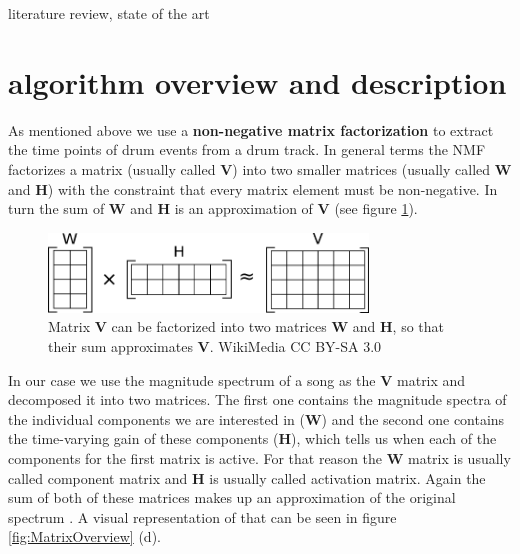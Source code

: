 \documentclass{article}
\begin{document}
\noindent\makebox[\linewidth]{\rule{\linewidth}{0.4pt}}
literature review, state of the art




\section{algorithm overview and description}
\label{sec:algo}

As mentioned above we use a \textbf{non-negative matrix factorization} to extract the time points of drum events from a drum track.
In general terms the NMF factorizes a matrix (usually called $\mathbf{V}$) into two smaller matrices (usually called $\mathbf{W}$ and $\mathbf{H}$) with the constraint that every matrix element must be non-negative.
In turn the sum of $\mathbf{W}$ and $\mathbf{H}$ is an approximation of $\mathbf{V}$ (see figure \ref{fig:NMF}).

\begin{figure}[htb]

\begin{minipage}[b]{1.0\linewidth}
  \centering
  \centerline{\includegraphics[width=8.5cm]{figures/NMF}}
  \medskip
\end{minipage}

\caption{Matrix $\mathbf{V}$ can be factorized into two matrices $\mathbf{W}$ and $\mathbf{H}$, so that their sum approximates $\mathbf{V}$. \scriptsize{\textsf{\textcopyright} WikiMedia CC BY-SA 3.0}}
\label{fig:NMF}

\end{figure}

In our case we use the magnitude spectrum of a song as the $\mathbf{V}$ matrix and decomposed it into two matrices.
The first one contains the magnitude spectra of the individual components we are interested in ($\mathbf{W}$) and the second one contains the time-varying gain of these components ($\mathbf{H}$), which tells us when each of the components for the first matrix is active.
For that reason the $\mathbf{W}$ matrix is usually called component matrix and $\mathbf{H}$ is usually called activation matrix.
Again the sum of both of these matrices makes up an approximation of the original spectrum \cite{smaragdis2003}.
A visual representation of that can be seen in figure \ref{fig:MatrixOverview} (d).
\end{document}
